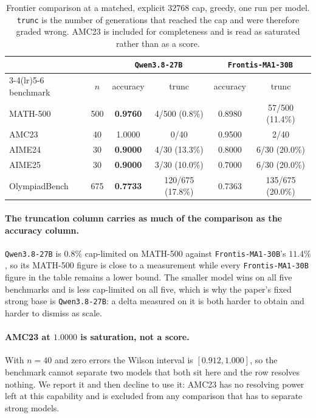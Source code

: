 \begin{table}[t]
\centering\small
\caption{Frontier comparison at a matched, explicit $32768$ cap, greedy, one run per model.
\texttt{trunc} is the number of generations that reached the cap and were therefore graded
wrong. AMC23 is included for completeness and is read as saturated rather than as a score.}
\label{tab:frontier}
\begin{tabular}{lccccc}
\toprule
 & & \multicolumn{2}{c}{\texttt{Qwen3.8-27B}} & \multicolumn{2}{c}{\texttt{Frontis-MA1-30B}} \\
\cmidrule(lr){3-4}\cmidrule(lr){5-6}
benchmark & $n$ & accuracy & trunc & accuracy & trunc \\
\midrule
MATH-500      & 500 & \textbf{0.9760} & 4/500 (0.8\%)   & 0.8980 & 57/500 (11.4\%) \\
AMC23         & 40  & 1.0000          & 0/40            & 0.9500 & 2/40 \\
AIME24        & 30  & \textbf{0.9000} & 4/30 (13.3\%)   & 0.8000 & 6/30 (20.0\%) \\
AIME25        & 30  & \textbf{0.9000} & 3/30 (10.0\%)   & 0.7000 & 6/30 (20.0\%) \\
OlympiadBench & 675 & \textbf{0.7733} & 120/675 (17.8\%) & 0.7363 & 135/675 (20.0\%) \\
\bottomrule
\end{tabular}
\end{table}

\paragraph{The truncation column carries as much of the comparison as the accuracy column.}
\texttt{Qwen3.8-27B} is $0.8\%$ cap-limited on MATH-500 against \texttt{Frontis-MA1-30B}'s
$11.4\%$, so its MATH-500 figure is close to a measurement while every
\texttt{Frontis-MA1-30B} figure in the table remains a lower bound. The smaller model wins on
all five benchmarks and is less cap-limited on all five, which is why the paper's fixed strong
base is \texttt{Qwen3.8-27B}: a delta measured on it is both harder to obtain and harder to
dismiss as scale.

\paragraph{AMC23 at $1.0000$ is saturation, not a score.} With $n=40$ and zero errors the
Wilson interval is $[0.912, 1.000]$, so the benchmark cannot separate two models that both sit
here and the row resolves nothing. We report it and then decline to use it: AMC23 has no
resolving power left at this capability and is excluded from any comparison that has to
separate strong models.

